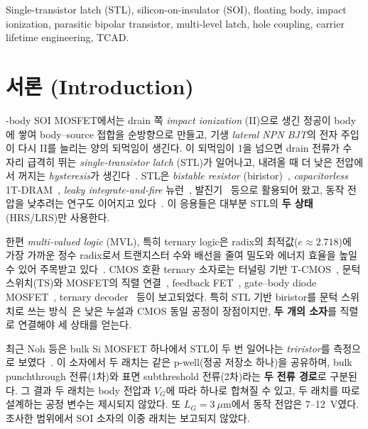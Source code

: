 \documentclass[journal]{IEEEtran}
\begin{document}
\begin{IEEEkeywords}
Single-transistor latch (STL), silicon-on-insulator (SOI), floating body, impact ionization, parasitic bipolar transistor, multi-level latch, hole coupling, carrier lifetime engineering, TCAD.
\end{IEEEkeywords}

\section{서론 (Introduction)}
-body SOI MOSFET에서는 drain 쪽 \textit{impact ionization} (II)으로 생긴 정공이 body에 쌓여 body--source 접합을 순방향으로 만들고, 기생 \textit{lateral NPN BJT}의 전자 주입이 다시 II를 늘리는 양의 되먹임이 생긴다. 이 되먹임이 1을 넘으면 drain 전류가 수 자리 급격히 뛰는 \textit{single-transistor latch} (STL)가 일어나고, 내려올 때 더 낮은 전압에서 꺼지는 \textit{hysteresis}가 생긴다~\cite{chen_stl}. STL은 \textit{bistable resistor} (biristor)~\cite{han_biristor}, \textit{capacitorless} 1T-DRAM~\cite{kim_1tdram,moon_fin}, \textit{leaky integrate-and-fire} 뉴런~\cite{han_lif,han_mimic,han_sciadv}, 발진기~\cite{kim_osc} 등으로 활용되어 왔고, 동작 전압을 낮추려는 연구도 이어지고 있다~\cite{lee_1v}. 이 응용들은 대부분 STL의 \textbf{두 상태}(HRS/LRS)만 사용한다.

한편 \textit{multi-valued logic} (MVL), 특히 ternary logic은 radix의 최적값($e\approx2.718$)에 가장 가까운 정수 radix로서 트랜지스터 수와 배선을 줄여 밀도와 에너지 효율을 높일 수 있어 주목받고 있다~\cite{han_ptmos,han_bts}. CMOS 호환 ternary 소자로는 터널링 기반 T-CMOS~\cite{jeong_tcmos}, 문턱 스위치(TS)와 MOSFET의 직렬 연결~\cite{heo_nbo2,han_bts,han_ptmos}, feedback FET~\cite{son_fbfet}, gate--body diode MOSFET~\cite{kim_spti}, ternary decoder~\cite{han_tld} 등이 보고되었다. 특히 STL 기반 biristor를 문턱 스위치로 쓰는 방식~\cite{han_bts,han_ptmos}은 낮은 누설과 CMOS 동일 공정이 장점이지만, \textbf{두 개의 소자}를 직렬로 연결해야 세 상태를 얻는다.

최근 Noh 등은 bulk Si MOSFET 하나에서 STL이 두 번 일어나는 \textit{triristor}를 측정으로 보였다~\cite{noh_triristor}. 이 소자에서 두 래치는 같은 p-well(정공 저장소 하나)을 공유하며, bulk punchthrough 전류(1차)와 표면 subthreshold 전류(2차)라는 \textbf{두 전류 경로}로 구분된다. 그 결과 두 래치는 body 전압과 $V_G$에 따라 하나로 합쳐질 수 있고, 두 래치를 따로 설계하는 공정 변수는 제시되지 않았다. 또 $L_G=3~\mu$m에서 동작 전압은 7--12~V였다. 조사한 범위에서 SOI 소자의 이중 래치는 보고되지 않았다.
\end{document}
